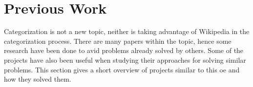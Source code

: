 \chapter{Previous Work}
Categorization is not a new topic, neither is taking advantage of Wikipedia in the categorization process. There are many papers within the topic, hence some research have been done to avid problems already solved by others. Some of the projects have also been useful when studying their approaches for solving similar problems. This section gives a short overview of projects similar to this oe and how they solved them.








